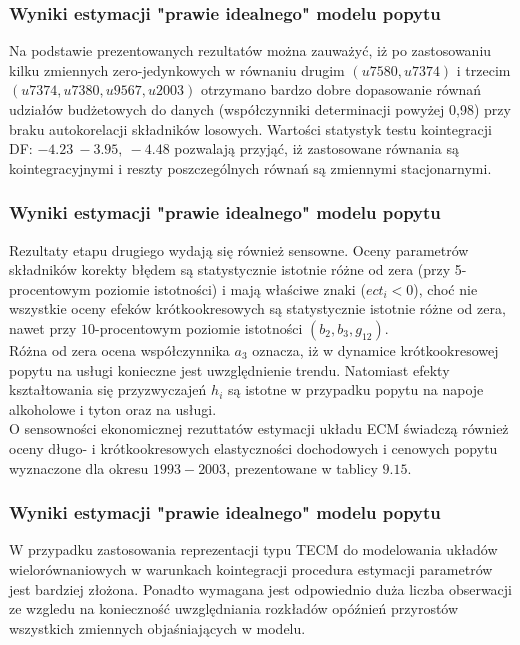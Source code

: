 \documentclass[11pt,usenames,dvipsnames,svgnames,x11names]{beamer}\usepackage[]{graphicx}\usepackage[]{color}
\theoremstyle{definition}
\theoremstyle{remark}
\begin{document}
\begin{frame}

\end{frame}


 \begin{frame}
 \frametitle{Wyniki estymacji "prawie idealnego" modelu popytu }
 Na podstawie prezentowanych rezultatów można zauważyć, iż po zastosowaniu 
kilku zmiennych zero-jedynkowych w równaniu drugim $(u7580, u7374)$ i trzecim $(u7374, u7380, u9567, u2003)$ otrzymano bardzo dobre dopasowanie równań udziałów budżetowych do danych (współczynniki determinacji powyżej 0,98) przy braku autokorelacji składników losowych. Wartości statystyk testu kointegracji DF: $-4.23\ -3.95,\ -4.48$ pozwalają przyjąć, iż zastosowane równania są kointegracyjnymi i reszty poszczególnych równań są zmiennymi stacjonarnymi. 
\end{frame}

\begin{frame}
\frametitle{Wyniki estymacji "prawie idealnego" modelu popytu }
Rezultaty etapu drugiego wydają się również sensowne. Oceny parametrów składników korekty błędem są statystycznie istotnie różne od zera (przy 5-procentowym poziomie istotności) i mają właściwe znaki ($ect_i<0$), choć nie wszystkie oceny efeków krótkookresowych są statystycznie istotnie różne od zera, nawet przy $10$-procentowym poziomie istotności $(b_2, b_3, g_{12})$.\\
Różna od zera ocena współczynnika $a_3$ oznacza, iż w dynamice krótkookresowej popytu na usługi konieczne jest uwzględnienie trendu. Natomiast efekty kształtowania się przyzwyczajeń $h_i$ są istotne w przypadku popytu na napoje alkoholowe i tyton oraz na usługi.\\
O sensowności ekonomicznej rezuttatów estymacji układu ECM świadczą również oceny długo- i krótkookresowych elastyczności dochodowych i cenowych popytu wyznaczone dla okresu $1993-2003$, prezentowane w tablicy $9.15$. 
\end{frame}
 
 \begin {frame}
 \frametitle{Wyniki estymacji "prawie idealnego" modelu popytu }
 W przypadku zastosowania reprezentacji typu TECM do modelowania układów wielorównaniowych w warunkach kointegracji procedura estymacji parametrów jest bardziej złożona. Ponadto wymagana jest odpowiednio duża liczba obserwacji ze wzgledu na konieczność uwzględniania rozkładów opóźnień przyrostów wszystkich zmiennych objaśniających w modelu.
 \end{frame}
 
\end{document}
